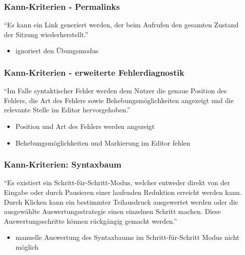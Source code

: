 \documentclass[10pt]{beamer}
\begin{document}
\begin{frame}
\frametitle{Kann-Kriterien - \alert{Permalinks}}
\enquote{Es kann ein Link generiert werden, der beim Aufrufen den gesamten Zustand
der Sitzung wiederherstellt.}
\begin{itemize}
\item ignoriert den Übungsmodus
\end{itemize}
\end{frame}

\begin{frame}
\frametitle{Kann-Kriterien - \alert{erweiterte Fehlerdiagnostik}}
\enquote{Im Falle syntaktischer Fehler werden dem Nutzer die genaue Position des Fehlers, die
Art des Fehlers sowie Behebungsmöglichkeiten angezeigt und die relevante Stelle im
Editor hervorgehoben.}
\begin{itemize}
\item Position und Art des Fehlers werden angezeigt
\item Behebungsmöglichkeiten und Markierung im Editor fehlen
\end{itemize}
\end{frame}

\begin{frame}
\frametitle{Kann-Kriterien: \alert{Syntaxbaum}}
\enquote{Es existiert ein Schritt-für-Schritt-Modus, welcher entweder direkt von der Eingabe
oder durch Pausieren einer laufenden Reduktion erreicht werden kann.
Durch Klicken kann ein bestimmter Teilausdruck ausgewertet werden oder die ausgewählte
Auswertungsstrategie einen einzelnen Schritt machen. Diese Auswertungsschritte können rückgängig
gemacht werden.}
\begin{itemize}
\item manuelle Auswertung des Syntaxbaums im Schritt-für-Schritt Modus nicht möglich
\end{itemize}
\end{frame}
\end{document}
